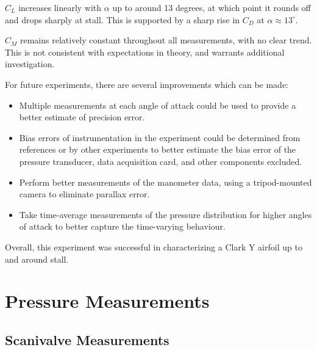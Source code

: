 \documentclass[runningheads]{llncs}
\begin{document}
$C_L$ increases linearly with $\alpha$ up to around 13 degrees, at which point it rounds off and drops sharply at stall. This is supported by a sharp rise in $C_D$ at $\alpha \approx 13^\circ$.

$C_M$ remains relatively constant throughout all measurements, with no clear trend. This is not consistent with expectations in theory, and warrants additional investigation.

For future experiments, there are several improvements which can be made:
\begin{itemize}
    \item Multiple measurements at each angle of attack could be used to provide a better estimate of precision error.
    \item Bias errors of instrumentation in the experiment could be determined from references or by other experiments to better estimate the bias error of the pressure transducer, data acquisition card, and other components excluded.
    \item Perform better measurements of the manometer data, using a tripod-mounted camera to eliminate parallax error.
    \item Take time-average measurements of the pressure distribution for higher angles of attack to better capture the time-varying behaviour.
\end{itemize}

Overall, this experiment was successful in characterizing a Clark Y airfoil up to and around stall.








\appendix

\section{Pressure Measurements}

\subsection{Scanivalve Measurements}
\end{document}

